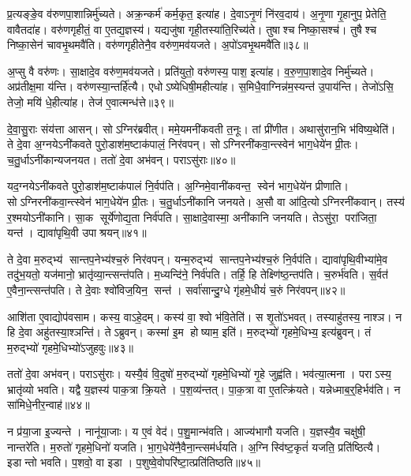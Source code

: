 प्र॒त्यङ्ङे॒व व॑रुणपा॒शान्निर्मु॑च्यते।
अक्र॒न्कर्म॑ कर्म॒कृत॒ इत्या॑ह।
दे॒वाऽनृ॒णं नि॑रव॒दाय॑।
अ॒नृ॒णा गृ॒हानुप॒ प्रेतेति॒ वावैतदा॑ह।
वरु॑णगृहीतं॒ वा ए॒तद्य॒ज्ञस्य॑।
यद्यजु॑षा गृही॒तस्या॑ति॒रिच्य॑ते।
तुषाश्च निष्का॒सश्च॑।
तुषैश्च निष्का॒सेन॑ चावभृ॒थमवै॑ति।
वरु॑णगृहीतेनै॒व वरु॑ण॒मव॑यजते।
अ॒पो॑ऽवभृ॒थमवै॑ति॥३८॥

अ॒प्सु वै वरु॑णः।
सा॒क्षादे॒व वरु॑ण॒मव॑यजते।
प्रति॑युतो॒ वरु॑णस्य॒ पाश॒ इत्या॑ह।
व॒रु॒ण॒पा॒शादे॒व निर्मु॑च्यते।
अप्र॑तीक्ष॒मा य॑न्ति।
वरु॑णस्या॒न्तर्\mbox{}हि॑त्यै।
एधोऽष्येधिषी॒महीत्या॑ह।
स॒मिधै॒वाग्निन्न॑म॒स्यन्त॑ उ॒पाय॑न्ति।
तेजो॑ऽसि॒ तेजो॒ मयि॑ धे॒हीत्या॑ह।
तेज॑ ए॒वात्मन्ध॑त्ते॥३९॥

दे॒वा॒सु॒राः संय॑त्ता आसन्।
सोऽग्निर॑ब्रवीत्।
ममे॒यमनी॑कवती त॒नूः।
तां प्री॑णीत।
अथासु॑रान॒भि भ॑विष्य॒थेति॑।
ते दे॒वा अ॒ग्नयेऽनी॑कवते पुरो॒डाश॑म॒ष्टाक॑पालं॒ निर॑वपन्।
सोऽग्निरनी॑कवा॒न्त्स्वेन॑ भाग॒धेये॑न प्री॒तः।
च॒तु॒र्धाऽनी॑कान्यजनयत।
ततो॑ दे॒वा अभ॑वन्।
पराऽसु॑राः॥४०॥

यद॒ग्नयेऽनी॑कवते पुरो॒डाश॑म॒ष्टाक॑पालं नि॒र्वप॑ति।
अ॒ग्निमे॒वानी॑कवन्त॒ स्वेन॑ भाग॒धेये॑न प्रीणाति।
सोऽग्निरनी॑कवा॒न्त्स्वेन॑ भाग॒धेये॑न प्री॒तः।
च॒तु॒र्धाऽनी॑कानि जनयते।
अ॒सौ वा आ॑दि॒त्योऽग्निरनी॑कवान्।
तस्य॑ र॒श्मयोऽनी॑कानि।
सा॒क सूर्ये॑णोद्य॒ता निर्व॑पति।
सा॒क्षादे॒वास्मा॒ अनी॑कानि जनयति।
तेऽसु॑रा॒ परा॑जिता॒ यन्त॑।
द्यावा॑पृथि॒वी उपाश्रयन्॥४१॥

ते दे॒वा म॒रुद्भ्य॑ सान्तप॒नेभ्य॑श्च॒रुं निर॑वपन्।
यन्म॒रुद्भ्य॑ सान्तप॒नेभ्य॑श्च॒रुं नि॒र्वप॑ति।
द्यावा॑पृथि॒वीभ्या॑मे॒व तदु॑भ॒यतो॒ यज॑मानो॒ भ्रातृ॑व्या॒न्त्सन्त॑पति।
म॒ध्यन्दि॑ने॒ निर्व॑पति।
तर्\mbox{}हि॒ हि तेक्ष्णि॑ष्ठ॒न्तप॑ति।
च॒रुर्भ॑वति।
स॒र्वत॑ ए॒वैना॒न्त्सन्त॑पति।
ते दे॒वाः श्वो॑विज॒यिन॒ सन्त॑।
सर्वा॑सान्दु॒ग्धे गृ॑हमे॒धीयं॑ च॒रुं निर॑वपन्॥४२॥

आशि॑ता ए॒वाद्योप॑वसाम।
कस्य॒ वाऽहे॒दम्।
कस्य॑ वा॒ श्वो भ॑वि॒तेति॑।
स शृ॒तो॑ऽभवत्।
तस्याहु॑तस्य॒ नाश्ञ\sn{}।
न हि दे॒वा अहु॑तस्या॒श्ञन्ति॑।
तेऽब्रुवन्।
कस्मा॑ इ॒म होष्याम॒ इति॑।
म॒रुद्भ्यो॑ गृहमे॒धिभ्य॒ इत्य॑ब्रुवन्।
तं म॒रुद्भ्यो॑ गृहमे॒धिभ्यो॑ऽजुहवुः॥४३॥

ततो॑ दे॒वा अभ॑वन्।
पराऽसु॑राः।
यस्यै॒वं वि॒दुषो॑ म॒रुद्भ्यो॑ गृहमे॒धिभ्यो॑ गृ॒हे जुह्व॑ति।
भव॑त्या॒त्मना।
पराऽस्य॒ भ्रातृ॑व्यो भवति।
यद्वै य॒ज्ञस्य॑ पाक॒त्रा क्रि॒यते।
प॒श॒व्य॑न्तत्।
पा॒क॒त्रा वा ए॒तत्क्रि॑यते।
यन्नेध्माब॒र्॒हिर्भव॑ति।
न सा॑मिधे॒नीर॒न्वाह॑॥४४॥

न प्र॑या॒जा इ॒ज्यन्ते।
नानू॑या॒जाः।
य ए॒वं वेद॑।
प॒शु॒मान्भ॑वति।
आज्य॑भागौ यजति।
य॒ज्ञस्यै॒व चक्षु॑षी॒ नान्तरे॑ति।
म॒रुतो॑ गृहमे॒धिनो॑ यजति।
भा॒ग॒धेये॑नै॒वैना॒न्त्सम॑र्धयति।
अ॒ग्निस्वि॑ष्ट॒कृतं॑ यजति॒ प्रति॑ष्ठित्यै।
इडान्तो भवति।
प॒शवो॒ वा इडा।
प॒शुष्वे॒वोपरि॑ष्टा॒त्प्रति॑तिष्ठति॥४५॥

